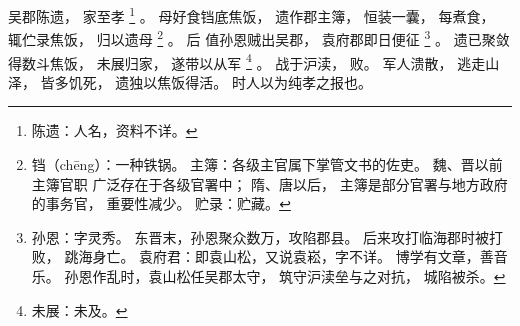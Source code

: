 
\switchcolumn*[\section{}]

吴郡陈遗，
家至孝%
\footnote{%
    陈遗：人名，资料不详。
}%
。
母好食铛底焦饭，
遗作郡主簿，
恒装一囊，
每煮食，
辄伫录焦饭，
归以遗母%
\footnote{%
    铛（chēng）：一种铁锅。
    主簿：各级主官属下掌管文书的佐吏。
          魏、晋以前主簿官职
          广泛存在于各级官署中；
          隋、唐以后，
          主簿是部分官署与地方政府的事务官，
          重要性减少。
    贮录：贮藏。
}%
。
后
值孙恩贼出吴郡，
袁府郡即日便征%
\footnote{%
    孙恩：字灵秀。
          东晋末，孙恩聚众数万，攻陷郡县。
          后来攻打临海郡时被打败，
          跳海身亡。
    袁府君：即袁山松，又说袁崧，字不详。
            博学有文章，善音乐。
            孙恩作乱时，袁山松任吴郡太守，
            筑守沪渎垒与之对抗，
            城陷被杀。
}%
。
遗已聚敛得数斗焦饭，
未展归家，
遂带以从军%
\footnote{%
    未展：未及。
}%
。
战于沪渎，
败。
军人溃散，
逃走山泽，
皆多饥死，
遗独以焦饭得活。
时人以为纯孝之报也。

\switchcolumn


